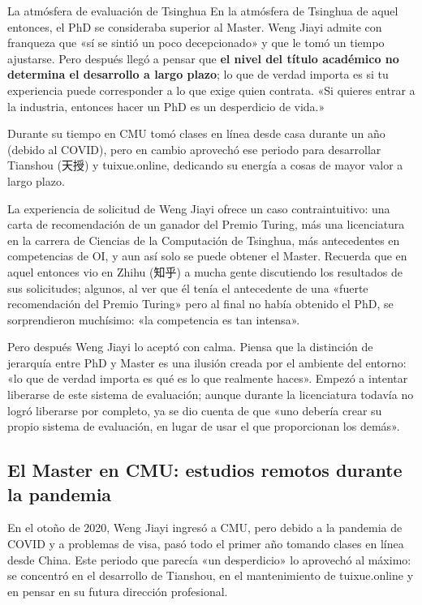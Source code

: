 \documentclass[a4paper]{article}
\begin{document}
\begin{knowledgebox}{La atmósfera de evaluación de Tsinghua}
En la atmósfera de Tsinghua de aquel entonces, el PhD se consideraba superior al Master. Weng Jiayi admite con franqueza que «sí se sintió un poco decepcionado» y que le tomó un tiempo ajustarse. Pero después llegó a pensar que \textbf{el nivel del título académico no determina el desarrollo a largo plazo}; lo que de verdad importa es si tu experiencia puede corresponder a lo que exige quien contrata. «Si quieres entrar a la industria, entonces hacer un PhD es un desperdicio de vida.»
\end{knowledgebox}

Durante su tiempo en CMU tomó clases en línea desde casa durante un año (debido al COVID), pero en cambio aprovechó ese periodo para desarrollar Tianshou (天授) y tuixue.online, dedicando su energía a cosas de mayor valor a largo plazo.

La experiencia de solicitud de Weng Jiayi ofrece un caso contraintuitivo: una carta de recomendación de un ganador del Premio Turing, más una licenciatura en la carrera de Ciencias de la Computación de Tsinghua, más antecedentes en competencias de OI, y aun así solo se puede obtener el Master. Recuerda que en aquel entonces vio en Zhihu (知乎) a mucha gente discutiendo los resultados de sus solicitudes; algunos, al ver que él tenía el antecedente de una «fuerte recomendación del Premio Turing» pero al final no había obtenido el PhD, se sorprendieron muchísimo: «la competencia es tan intensa».

Pero después Weng Jiayi lo aceptó con calma. Piensa que la distinción de jerarquía entre PhD y Master es una ilusión creada por el ambiente del entorno: «lo que de verdad importa es qué es lo que realmente haces». Empezó a intentar liberarse de este sistema de evaluación; aunque durante la licenciatura todavía no logró liberarse por completo, ya se dio cuenta de que «uno debería crear su propio sistema de evaluación, en lugar de usar el que proporcionan los demás».

\subsection{El Master en CMU: estudios remotos durante la pandemia}

En el otoño de 2020, Weng Jiayi ingresó a CMU, pero debido a la pandemia de COVID y a problemas de visa, pasó todo el primer año tomando clases en línea desde China. Este periodo que parecía «un desperdicio» lo aprovechó al máximo: se concentró en el desarrollo de Tianshou, en el mantenimiento de tuixue.online y en pensar en su futura dirección profesional.
\end{document}
